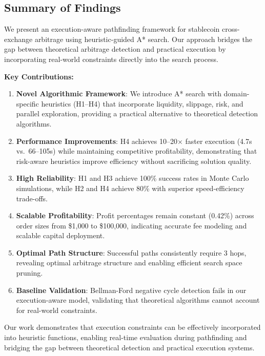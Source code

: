 \subsection{Summary of Findings}

We present an execution-aware pathfinding framework for stablecoin cross-exchange arbitrage using heuristic-guided A* search. Our approach bridges the gap between theoretical arbitrage detection and practical execution by incorporating real-world constraints directly into the search process.

\textbf{Key Contributions:}

\begin{enumerate}
    \item \textbf{Novel Algorithmic Framework}: We introduce A* search with domain-specific heuristics (H1--H4) that incorporate liquidity, slippage, risk, and parallel exploration, providing a practical alternative to theoretical detection algorithms.

    \item \textbf{Performance Improvements}: H4 achieves 10--20× faster execution (4.7s vs.\ 66--105s) while maintaining competitive profitability, demonstrating that risk-aware heuristics improve efficiency without sacrificing solution quality.

    \item \textbf{High Reliability}: H1 and H3 achieve 100\% success rates in Monte Carlo simulations, while H2 and H4 achieve 80\% with superior speed-efficiency trade-offs.

    \item \textbf{Scalable Profitability}: Profit percentages remain constant (0.42\%) across order sizes from \$1,000 to \$100,000, indicating accurate fee modeling and scalable capital deployment.

    \item \textbf{Optimal Path Structure}: Successful paths consistently require 3 hops, revealing optimal arbitrage structure and enabling efficient search space pruning.

    \item \textbf{Baseline Validation}: Bellman-Ford negative cycle detection fails in our execution-aware model, validating that theoretical algorithms cannot account for real-world constraints.
\end{enumerate}

Our work demonstrates that execution constraints can be effectively incorporated into heuristic functions, enabling real-time evaluation during pathfinding and bridging the gap between theoretical detection and practical execution systems.

